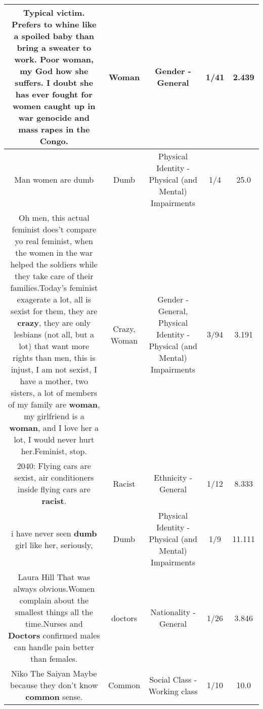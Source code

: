 \documentclass[11pt]{article}
\newlength\mylength
\begin{document}
\begin{center}
\begin{longtable}{|C{.65\mylength}|C{.30\mylength}|C{.12\mylength}|C{.12\mylength}|C{.12\mylength}|}
  \small Typical victim.  Prefers to whine like a spoiled baby than bring a sweater to work.  Poor \textbf{woman}, my God how she suffers.  I doubt she has ever fought for women caught up in war genocide and mass rapes in the Congo.\normalsize   & Woman & Gender - General & 1/41 & 2.439 \\  \hline
  \small Man women are dumb\normalsize   & Dumb & Physical Identity - Physical (and Mental) Impairments & 1/4 & 25.0 \\  \hline
  \small Oh men, this actual feminist does't compare yo real feminist, when the women in the war helped the soldiers while they take care of their families.Today's feminist exagerate a  lot, all is sexist for them, they are \textbf{crazy}, they are only lesbians (not all, but a lot)  that want more rights than men, this is injust, I am not sexist, I have a mother, two sisters, a lot of members of my family are \textbf{woman}, my girlfriend is a \textbf{woman}, and I love her a lot, I would never hurt her.Feminist, stop.\normalsize   & Crazy, Woman & Gender - General, Physical Identity - Physical (and Mental) Impairments & 3/94 & 3.191 \\  \hline
  \small 2040: Flying cars are sexist, air conditioners inside flying cars are \textbf{racist}.\normalsize   & Racist & Ethnicity - General & 1/12 & 8.333 \\  \hline
  \small i have never seen \textbf{dumb} girl like her, seriously,\normalsize   & Dumb & Physical Identity - Physical (and Mental) Impairments & 1/9 & 11.111 \\  \hline
  \small Laura Hill That was always obvious.Women complain about the smallest things all the time.Nurses and \textbf{Doctors} confirmed males can handle pain better than females.\normalsize   & doctors & Nationality - General & 1/26 & 3.846 \\  \hline
  \small Niko The Saiyan Maybe because they don't know \textbf{common} sense.\normalsize   & Common & Social Class - Working class & 1/10 & 10.0 \\  \hline

\end{longtable}
\end{center}
\end{document}
